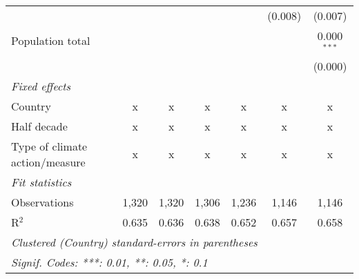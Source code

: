 \begin{tabular}{lcccccc}
                                                      &         &         &              &         & (0.008) & (0.007)\\   
   Population total                                   &         &         &              &         &         & 0.000$^{***}$\\   
                                                      &         &         &              &         &         & (0.000)\\   
   \emph{Fixed effects}\\
   Country                                            & x       & x       & x            & x       & x       & x\\  
   Half decade                                        & x       & x       & x            & x       & x       & x\\  
   Type of climate action/measure                     & x       & x       & x            & x       & x       & x\\  
   \midrule \emph{Fit statistics}\\
   Observations                                       & 1,320   & 1,320   & 1,306        & 1,236   & 1,146   & 1,146\\  
   R$^2$                                              & 0.635   & 0.636   & 0.638        & 0.652   & 0.657   & 0.658\\  
   \midrule
   \multicolumn{7}{l}{\emph{Clustered (Country) standard-errors in parentheses}}\\
   \multicolumn{7}{l}{\emph{Signif. Codes: ***: 0.01, **: 0.05, *: 0.1}}\\
\end{tabular}
\par\endgroup


